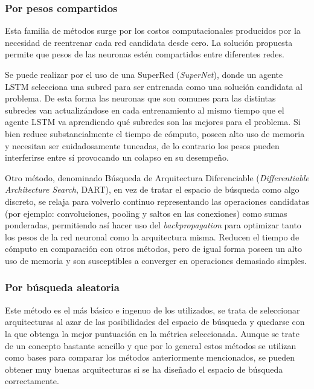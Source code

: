 \subsubsection{Por pesos compartidos}
Esta familia de métodos surge por los costos computacionales producidos por la necesidad de reentrenar cada red candidata desde cero. La solución propuesta permite que pesos de las neuronas estén compartidos entre diferentes redes.

Se puede realizar por el uso de una SuperRed (\textit{SuperNet}), donde un agente LSTM selecciona una subred para ser entrenada como una solución candidata al problema. De  esta forma las neuronas que son comunes para las distintas subredes van actualizándose en cada entrenamiento al mismo tiempo que el agente LSTM va aprendiendo qué subredes son las mejores para el problema. Si bien reduce substancialmente el tiempo de cómputo, poseen alto uso de memoria y necesitan ser cuidadosamente tuneadas, de lo contrario los pesos pueden interferirse entre sí provocando un colapso en su desempeño.

Otro método, denominado Búsqueda de Arquitectura Diferenciable (\textit{Differentiable Architecture Search}, DART), en vez de tratar el espacio de búsqueda como algo discreto, se relaja para volverlo continuo representando las operaciones candidatas (por ejemplo: convoluciones, pooling y saltos en las conexiones) como sumas ponderadas, permitiendo así hacer uso del \textit{backpropagation} para optimizar tanto los pesos de la red neuronal como la arquitectura misma. Reducen el tiempo de cómputo en comparación con otros métodos, pero de igual forma poseen un alto uso de memoria y son susceptibles a converger en operaciones demasiado simples.

\subsubsection{Por búsqueda aleatoria}
Este método es el más básico e ingenuo de los utilizados, se trata de seleccionar arquitecturas al azar de las posibilidades del espacio de búsqueda y quedarse con la que obtenga la mejor puntuación en la métrica seleccionada. Aunque se trate de un concepto bastante sencillo y que por lo general estos métodos se utilizan como bases para comparar los métodos anteriormente mencionados, se pueden obtener muy buenas arquitecturas si se ha diseñado el espacio de búsqueda correctamente.


